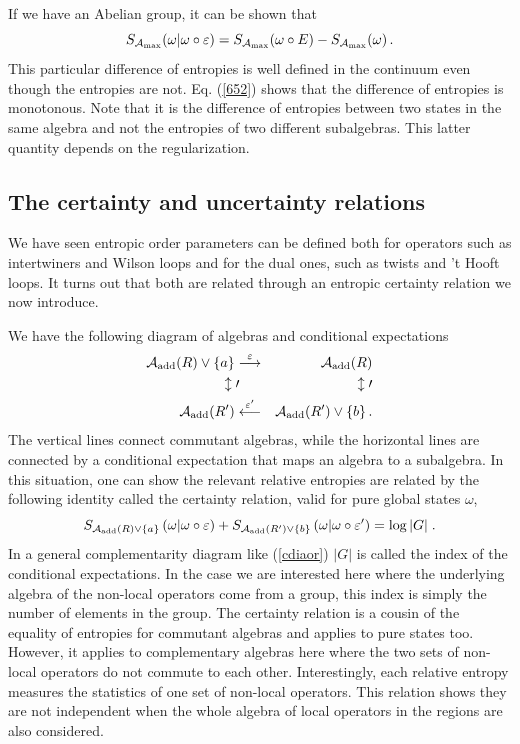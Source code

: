 \documentclass[12pt]{article}
\numberwithin{equation}{section}
\newcommand\eea{\end{eqnarray}}
\newcommand\bea{\begin{eqnarray}}
\newcommand{\be}{\begin{equation}}
\newcommand{\ee}{\end{equation}}
\begin{document}
If we have an Abelian group, it can be shown that 
\be
S_{{\cal A}_{\textrm{max}}}(\omega|\omega \circ \varepsilon)=S_{{\cal A}_{\textrm{max}}}(\omega\circ E)-S_{{\cal A}_{\textrm{max}}}(\omega)\,.\label{652}
\ee
This particular difference of entropies is well defined in the continuum even though the entropies are not. Eq. (\ref{652}) shows that the difference of entropies is monotonous. Note that it is the difference of entropies between two states in the same algebra and not the entropies of two different subalgebras. This latter quantity depends on the regularization. 
 
\subsection{The certainty and uncertainty relations}

We have seen entropic order parameters can be defined both for operators such as intertwiners and Wilson loops and for the dual ones, such as twists and 't Hooft loops. It turns out that both are related through an entropic certainty relation we now introduce.  

We have the following diagram of algebras and conditional expectations
\bea\label{cdiaor}
{\cal A}_{\textrm{add}}(R)\vee \{a\} & \overset{\varepsilon}{\longrightarrow} &{\cal A}_{\textrm{add}}(R)\nonumber \\
\updownarrow\prime \!\! &  & \,\updownarrow\prime\\
{\cal A}_{\textrm{add}}(R')& \overset{\varepsilon'}{\longleftarrow} & {\cal A}_{\textrm{add}}(R')\vee \{b\}\,.\nonumber 
\eea
The vertical lines connect commutant algebras, while the horizontal lines are connected by a conditional expectation that maps an algebra to a subalgebra. In this situation, one can show the relevant relative entropies are related by the following identity called the certainty relation, valid for pure global states $\omega$,  
\be
S_{{\cal A}_{\textrm{add}}(R)\vee \{a\}}\left(\omega|\omega\circ\varepsilon\right)+S_{{\cal A}_{\textrm{add}}(R')\vee \{b\}}\left(\omega|\omega\circ\varepsilon'\right)=\log |G|\;.\label{ede}
\ee
In a general complementarity diagram like (\ref{cdiaor}) $|G|$ is called the index of the conditional expectations. In the case we are interested here where the underlying algebra of the non-local operators come from a group, this index is simply the number of elements in the group.  
The certainty relation is a cousin of the equality of entropies for commutant algebras and applies to pure states too. However, it applies to complementary algebras here where the two sets of non-local operators do not commute to each other.   Interestingly, each relative entropy measures the statistics of one set of non-local operators. This relation shows they are not independent when the whole algebra of local operators in the regions are also considered.   
\end{document}
